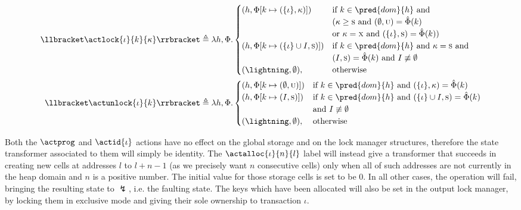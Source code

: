 \begin{defn}
\begin{align*}
	\llbracket \actlock{\iota}{k}{\kappa} \rrbracket &\triangleq \lambda h, \Phi \ldotp
	\begin{cases}
	(h, \Phi[k \mapsto (\{\iota\}, \kappa)]) & \text{if } k \in \pred{dom}{h} \text{ and} \\ & ( \kappa \geq \textsc{s} \text{ and } (\emptyset, \textsc{u}) = \hat{\Phi}(k) \\
	& \text{or } \kappa = \textsc{x} \text{ and } (\{\iota\}, \textsc{s}) = \hat{\Phi}(k) ) \\
	(h, \Phi[k \mapsto (\{\iota\} \cup I, \textsc{s})]) & \text{if } k \in \pred{dom}{h} \text{ and } \kappa = \textsc{s} \text{ and} \\ & (I, \textsc{s}) = \hat{\Phi}(k)
	\text{ and } I \not\equiv \emptyset \\
	(\lightning, \emptyset), & \text{otherwise}
	\end{cases} \\
	\llbracket \actunlock{\iota}{k} \rrbracket &\triangleq \lambda h, \Phi \ldotp
	\begin{cases}
	(h, \Phi[k \mapsto (\emptyset, \textsc{u})]) & \text{if } k \in \pred{dom}{h} \text{ and } (\{\iota\}, \kappa) = \hat{\Phi}(k) \\
	(h, \Phi[k \mapsto (I, \textsc{s})]) & \text{if } k \in \pred{dom}{h} \text{ and } (\{\iota\} \cup I, \textsc{s}) = \hat{\Phi}(k) \\ & \text{and } I \not\equiv \emptyset \\
	(\lightning, \emptyset), & \text{otherwise}
	\end{cases}
	\end{align*}
\end{defn}
Both the $\actprog$ and $\actid{\iota}$ actions have no effect on the global storage and on the lock manager structures, therefore the state transformer associated to them will simply be identity. The $\actalloc{\iota}{n}{l}$ label will instead give a transformer that succeeds in creating new cells at addresses $l$ to $l + n - 1$ (as we precisely want $n$ consecutive cells) only when all of such addresses are not currently in the heap domain and $n$ is a positive number. The initial value for those storage cells is set to be $0$. In all other cases, the operation will fail, bringing the resulting state to $\lightning$, i.e. the faulting state. The keys which have been allocated will also be set in the output lock manager, by locking them in exclusive mode and giving their sole ownership to transaction $\iota$.

